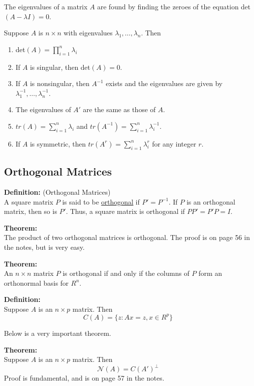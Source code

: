 \documentclass[12pt]{article}
\numberwithin{equation}{section}
\begin{document}
The eigenvalues of a matrix $A$ are found by finding the zeroes of the equation det$(A - \lambda I) = 0$.

Suppose $A$ is $n \times n$ with eigenvalues $\lambda_1, \ldots, \lambda_n$. Then
\begin{enumerate}
  \item det$(A) = \prod_{i = 1}^n \lambda_i$ 
  \item If $A$ is singular, then det$(A) = 0$.
  \item If $A$ is nonsingular, then $A^{-1}$ exists and the eigenvalues are given by $\lambda_1^{-1}, \ldots, \lambda_n^{-1}$.
  \item The eigenvalues of $A'$ are the same as those of $A$.
  \item $tr(A) = \sum_{i = 1}^n \lambda_i$ and 
  $tr(A^{-1}) = \sum_{i = 1}^n \lambda_i^{-1}$.
  \item If $A$ is symmetric, then 
  $tr(A^r) = \sum_{i = 1}^n \lambda_i^r$ for any integer $r$.
\end{enumerate}

\subsection{Orthogonal Matrices}
\textbf{Definition:} (Orthogonal Matrices) \\
A square matrix $P$ is said to be \underline{orthogonal} if $P' = P^{-1}$. If $P$ is an orthogonal matrix, then so is $P'$. Thus, a square matrix is orthogonal if $PP' = P'P = I$.

\textbf{Theorem:}\\
The product of two orthogonal matrices is orthogonal. The proof is on page 56 in the notes, but is very easy.

\textbf{Theorem:} \\
An $n \times n$ matrix $P$ is orthogonal if and only if the columns of $P$ form an orthonormal basis for $R^n$.

\textbf{Definition:} \\
Suppose $A$ is an $n \times p$ matrix. Then
\begin{equation*}
  C(A) = \{z: Ax = z, x \in R^p \}
\end{equation*}

Below is a very important theorem.

\textbf{Theorem:}\\
Suppose $A$ is an $n \times p$ matrix. Then
\begin{equation*}
  \mathcal{N}(A) = C(A')^{\perp}
\end{equation*}
Proof is fundamental, and is on page 57 in the notes.
\end{document}
